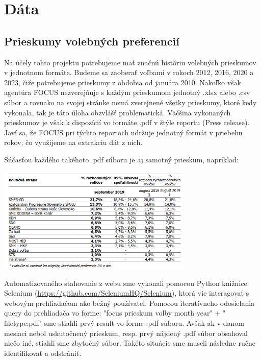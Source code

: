 \documentclass[report.tex]{subfiles}
\begin{document}
\section{Dáta}

\subsection{Prieskumy volebných preferencií}
Na účely tohto projektu potrebujeme mať značnú históriu volebných prieskumov v jednotnom formáte. Budeme sa zaoberať voľbami v rokoch 2012, 2016, 2020 a 2023, čiže potrebujeme prieskumy z obdobia od januára 2010.
Nakoľko však agentúra FOCUS nezverejňuje s každým prieskumom jednotný .xlsx alebo .csv súbor a rovnako na svojej stránke nemá zverejnené všetky prieskumy, ktoré kedy vykonala, tak je táto úloha obzvlášť problematická.
Väčšina vykonaných prieskumov je však k dispozícií vo formáte .pdf v štýle reportu (Press release). Javí sa, že FOCUS pri týchto reportoch udržuje jednotný formát v priebehu rokov, čo využijeme na extrakciu dát z nich.

Súčasťou každého takéhoto .pdf súboru je aj samotný prieskum, napríklad:

\begin{center}
\includegraphics[width=0.7\textwidth]{figs/priklad-focus-prieskumu.png}
\end{center}

Automatizovaného sťahovanie z webu sme vykonali pomocou Python knižnice Selenium (\href{https://github.com/SeleniumHQ/Selenium}{https://github.com/SeleniumHQ/Selenium}), ktorá vie interagovať s webovým prehliadačom ako bežný používateľ. Pomocou iteratívneho odosielania query do prehliadača vo forme: "focus prieskum volby {month} {year}" + " filetype:pdf" sme stiahli prvý result vo forme .pdf súboru. Avšak ak v danom mesiaci nebol uskutočnený prieskum, resp. prvý nájdený .pdf súbor obsahoval niečo iné, stiahli sme zbytočný súbor. Takéto situácie sme museli následne ručne identifikovať a odstrániť. 
\end{document}
